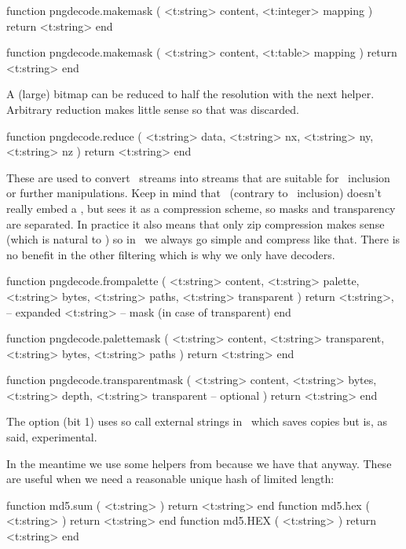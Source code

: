 \starttyping[option=LUA]
function pngdecode.makemask (
    <t:string>  content,
    <t:integer> mapping
)
    return <t:string>
end

function pngdecode.makemask (
    <t:string> content,
    <t:table>  mapping
)
    return <t:string>
end
\stoptyping

A (large) bitmap can be reduced to half the resolution with the next helper.
Arbitrary reduction makes little sense so that was discarded.

\starttyping[option=LUA]
function pngdecode.reduce (
    <t:string> data,
    <t:string> nx,
    <t:string> ny,
    <t:string> nz
)
    return <t:string>
end
\stoptyping

These are used to convert \PNG\ streams into streams that are suitable for \PDF\
inclusion or further manipulations. Keep in mind that \PDF\ (contrary to \JPEG\
inclusion) doesn't really embed a \PNG, but sees it as a compression scheme, so
masks and transparency are separated. In practice it also means that only zip
compression makes sense (which is natural to \PDF) so in \CONTEXT\ we always go
simple and compress like that. There is no benefit in the other filtering which
is why we only have decoders.

\starttyping[option=LUA]
function pngdecode.frompalette (
    <t:string> content,
    <t:string> palette,
    <t:string> bytes,
    <t:string> paths,
    <t:string> transparent
)
    return
        <t:string>, -- expanded
        <t:string>  -- mask (in case of transparent)
end

function pngdecode.palettemask (
    <t:string> content,
    <t:string> transparent,
    <t:string> bytes,
    <t:string> paths
)
    return <t:string>
end

function pngdecode.transparentmask (
    <t:string> content,
    <t:string> bytes,
    <t:string> depth,
    <t:string> transparent -- optional
)
    return <t:string>
end
\stoptyping

The  option (bit 1) uses so call external strings
in \LUA\ which saves copies but is, as said, experimental.

\stopsubsection

\startsubsection[title=MD5 hashing]

In the meantime we use some helpers from  because we have that
anyway. These are useful when we need a reasonable unique hash of limited length:

\starttyping[option=LUA]
function md5.sum ( <t:string> ) return <t:string> end
function md5.hex ( <t:string> ) return <t:string> end
function md5.HEX ( <t:string> ) return <t:string> end
\stoptyping

